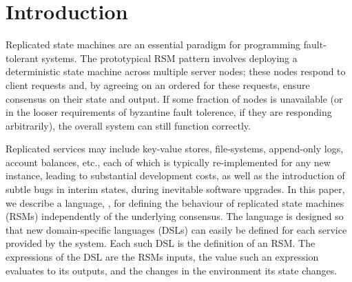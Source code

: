 \section{Introduction}
\label{s:introduction}







Replicated state machines are an essential paradigm for programming
fault-tolerant systems. The prototypical RSM pattern involves deploying a
deterministic state machine across multiple server nodes; these nodes respond
to client requests and, by agreeing on an ordered for these requests, ensure consensus
on their state and output. If some fraction of nodes is unavailable (or in the looser
requirements of byzantine fault tolerence, if they are responding arbitrarily),
the overall system can still function correctly.

Replicated services may include key-value stores, file-systems,
append-only logs, account balances, etc., each of which
is typically re-implemented for any new instance, leading to substantial development
costs, as well as the introduction of subtle bugs in interim states, during
inevitable software upgrades. In this paper, we describe a language, \rad{}, for
defining the behaviour of replicated state machines (RSMs) independently of the
underlying consensus. The language is designed so that new domain-specific
languages (DSLs) can easily be defined for each service provided by the system.
Each such DSL is the definition of an RSM. The expressions of the DSL
are the RSMs inputs, the value such an expression evaluates to its outputs, and
the changes in the environment its state changes.


